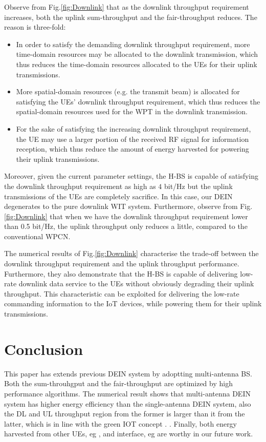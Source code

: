 \documentclass[12pt,draft,onecolumn,journal]{IEEEtran}
\begin{document}
Observe from Fig.\ref{fig:Downlink} that as the downlink throughput requirement increases, both the uplink sum-throughput and the fair-throughput reduces. The reason is three-fold:
\begin{itemize}
	\item In order to satisfy the demanding downlink throughput requirement, more time-domain resources may be allocated to the downlink transmission, which thus reduces the time-domain resources allocated to the UEs for their uplink transmissions. 
	\item More spatial-domain resources (e.g. the transmit beam) is allocated for satisfying the UEs' downlink throughput requirement, which thus reduces the spatial-domain resources used for the WPT in the downlink transmission. 
	\item For the sake of satisfying the increasing downlink throughput requirement, the UE may use a larger portion of the received RF signal for information reception, which thus reduce the amount of energy harvested for powering their uplink transmissions.
\end{itemize}
Moreover, given the current parameter settings, the H-BS is capable of satisfying the downlink throughput requirement as high as $4$ bit/Hz but the uplink transmissions of the UEs are completely sacrifice. In this case, our DEIN degenerates to the pure downlink WIT system. Furthermore, observe from Fig.\ref{fig:Downlink} that when we have the downlink throughput requirement lower than 0.5 bit/Hz, the uplink throughput only reduces a little, compared to the conventional WPCN. 

The numerical results of Fig.\ref{fig:Downlink} characterise the trade-off between the downlink throughput requirement and the uplink throughput performance. Furthermore, they also demonstrate that the H-BS is capable of delivering low-rate downlink data service to the UEs without obviously degrading their uplink throughput. This characteristic can be exploited for delivering the low-rate commanding information to the IoT devices, while powering them for their uplink transmissions.

\section{Conclusion}
This paper has extends previous DEIN system by adoptting multi-antenna BS. Both the sum-throuhgput and the fair-throughput are optimized by high performance algorithms. The numerical result shows that multi-antenna DEIN system has higher energy efficiency than the single-antenna DEIN system, also the DL and UL throughput region from the former is larger than it from the latter, \cbstart which is in line with the green IOT concept \cite{access_5}. \cbend. \cbstart Finally, both energy harvested from other UEs, eg \cite{access_1}, and interface, eg \cite{access_2} are worthy in our future work. \cbend


 






\end{document}

